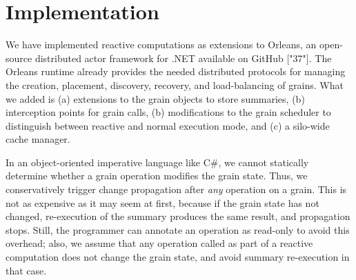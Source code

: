 \section{Implementation} \label{sec:implementation}

We have implemented reactive computations as extensions to Orleans, an open-source distributed actor framework for .NET available on GitHub ["37"]. The Orleans runtime already provides the needed distributed protocols for managing the creation, placement, discovery, recovery, and load-balancing of grains. What we added is (a) extensions to the grain objects to store summaries, (b) interception points for grain calls, (b) modifications to the grain scheduler to distinguish between reactive and normal execution mode, and (c) a silo-wide cache manager. 

In an object-oriented imperative language like C\#, we cannot statically determine whether a grain operation modifies the grain state. Thus, we conservatively trigger change propagation after \emph{any} operation on a grain. This is not as expensive as it may seem at first, because if the grain state has not changed, re-execution of the summary produces the same result, and propagation stops. Still, the programmer can annotate an operation as read-only to avoid this overhead; also, we assume that any operation called as part of a reactive computation does not change the grain state, and avoid summary re-execution in that case.

